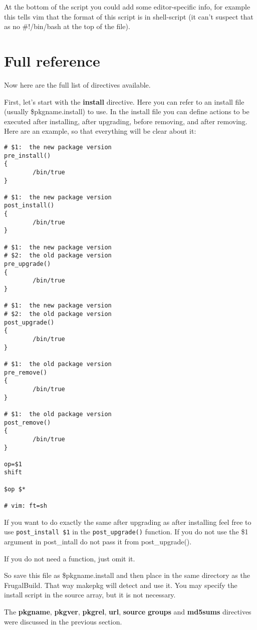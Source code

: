 At the bottom of the script you could add some editor-specific info, for example this tells vim that the format of this script is in shell-script (it can't suspect that as no #!/bin/bash at the top of the file).

\section{Full reference}

Now here are the full list of directives available.

First, let's start with the \textbf{install} directive. Here you can refer to an install file (usually \$pkgname.install) to use. In the install file you can define actions to be executed after installing, after upgrading, before removing, and after removing. Here are an example, so that everything will be clear about it:

\begin{verbatim}
# $1:  the new package version
pre_install()
{
        /bin/true
}

# $1:  the new package version
post_install()
{
        /bin/true
}

# $1:  the new package version
# $2:  the old package version
pre_upgrade()
{
        /bin/true
}

# $1:  the new package version
# $2:  the old package version
post_upgrade()
{
        /bin/true
}

# $1:  the old package version
pre_remove()
{
        /bin/true
}

# $1:  the old package version
post_remove()
{
        /bin/true
}

op=$1
shift

$op $*

# vim: ft=sh
\end{verbatim}

If you want to do exactly the same after upgrading as after installing feel
free to use {\tt post\_install \$1} in the {\tt post\_upgrade()} function. If
you do not use the \$1 argument in post_intall do not pass it from
post\_upgrade().

If you do not need a function, just omit it.

So save this file as \$pkgname.install and then place in the same directory as
the FrugalBuild. That way makepkg will detect and use it.
You may specify the install script in the source array, but it is not
necessary.

The \textbf{pkgname}, \textbf{pkgver}, \textbf{pkgrel}, \textbf{url}, \textbf{source} \textbf{groups} and \textbf{md5sums} directives were discussed in the previous section.

